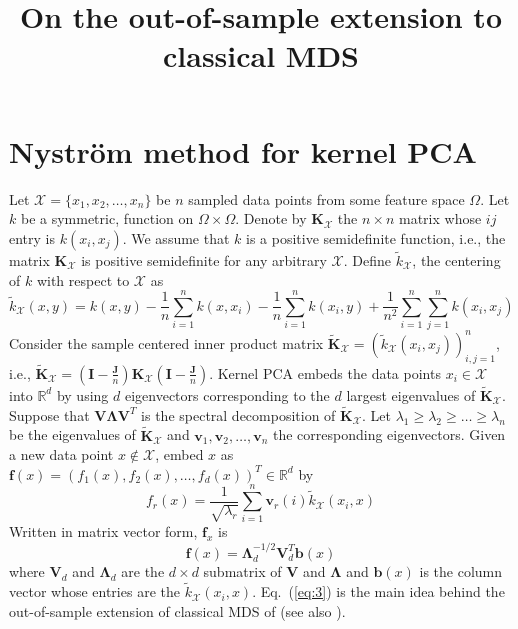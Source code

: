 \documentclass{article}
\begin{document}
\title{On the out-of-sample extension to classical MDS}
\maketitle
\section{Nystr\"{o}m method for kernel PCA}
Let $\mathcal{X} = \{x_1, x_2, \dots, x_n\}$ be $n$ sampled data
points from some feature space $\Omega$.  Let $k$ be a symmetric,
function on $\Omega \times \Omega$. Denote by
$\mathbf{K}_{\mathcal{X}}$ the $n \times n$ matrix whose $ij$ entry is
$k(x_i,x_j)$. We assume that $k$ is a positive semidefinite function,
i.e., the matrix $\mathbf{K}_{\mathcal{X}}$ is positive semidefinite
for any arbitrary $\mathcal{X}$. 
Define $\tilde{k}_{\mathcal{X}}$, the centering of $k$
with respect to $\mathcal{X}$ as
\begin{equation}
  \label{eq:1}
  \tilde{k}_{\mathcal{X}}(x,y) = k(x,y) -
  \frac{1}{n}\sum_{i=1}^{n}k(x,x_i) -
  \frac{1}{n}\sum_{i=1}^{n}k(x_i,y) + 
\frac{1}{n^2}\sum_{i=1}^{n}\sum_{j=1}^{n}k(x_i,x_j)
\end{equation}
Consider the sample centered inner product matrix
$\tilde{\mathbf{K}}_{\mathcal{X}} =
(\tilde{k}_{\mathcal{X}}(x_i,x_j))_{i,j=1}^{n}$, i.e.,
$\tilde{\mathbf{K}}_{\mathcal{X}} = (\mathbf{I} -
\tfrac{\mathbf{J}}{n})\mathbf{K}_{\mathcal{X}}(\mathbf{I} -
\tfrac{\mathbf{J}}{n})$. Kernel PCA
\citet{scholkopf97:_lectur_notes_comput_scien} embeds the data points
$x_i \in \mathcal{X}$ into $\mathbb{R}^{d}$ by using $d$ eigenvectors
corresponding to the $d$ largest eigenvalues of
$\tilde{\mathbf{K}}_{\mathcal{X}}$. Suppose that $\mathbf{V}
\bm{\Lambda} \mathbf{V}^{T}$ is the spectral decomposition of
$\tilde{\mathbf{K}}_{\mathcal{X}}$. Let $\lambda_1 \geq \lambda_2 \geq
\dots \geq \lambda_n$ be the eigenvalues of
$\tilde{\mathbf{K}}_{\mathcal{X}}$ and $\mathbf{v}_1, \mathbf{v}_2,
\dots, \mathbf{v}_n$ the corresponding eigenvectors. Given a new data
point $x \not \in \mathcal{X}$, \citet{williams01:_using_nystr} embed
$x$ as $\mathbf{f}(x) = (f_{1}(x), f_{2}(x), \dots, f_{d}(x))^{T} \in
\mathbb{R}^{d}$ by
\begin{equation}
  \label{eq:2}
  f_{r}(x) = \frac{1}{\sqrt{\lambda_r}} \sum_{i=1}^{n}{\mathbf{v}_{r}(i) 
\tilde{k}_{\mathcal{X}}(x_i,x)}
\end{equation}
Written in matrix vector form, $\mathbf{f}_x$ is
\begin{equation}
  \label{eq:3}
  \mathbf{f}(x) = \bm{\Lambda}_{d}^{-1/2} \mathbf{V}^{T}_d \mathbf{b}(x)
\end{equation}
where $\mathbf{V}_d$ and $\bm{\Lambda}_d$ are the $d \times d$
submatrix of $\mathbf{V}$ and $\bm{\Lambda}$ and $\mathbf{b}(x)$ is
the column vector whose entries are the
$\tilde{k}_{\mathcal{X}}(x_i,x)$. Eq.~(\ref{eq:3}) is the main idea
behind the out-of-sample extension of classical MDS of 
\citet{bengio04:_out_lle_isomap_mds_eigen} (see also
\cite{bengio06:_featur_extrac}). 
\end{document}

